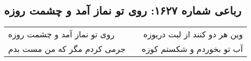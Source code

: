 \begin{center}
\section*{رباعی شماره ۱۶۲۷: روی تو نماز آمد و چشمت روزه}
\label{sec:1627}
\begin{longtable}{l p{0.5cm} r}
روی تو نماز آمد و چشمت روزه
&&
وین هر دو کنند از لبت دریوزه
\\
جرمی کردم مگر که من مست بدم
&&
آب تو بخوردم و شکستم کوزه
\\
\end{longtable}
\end{center}
